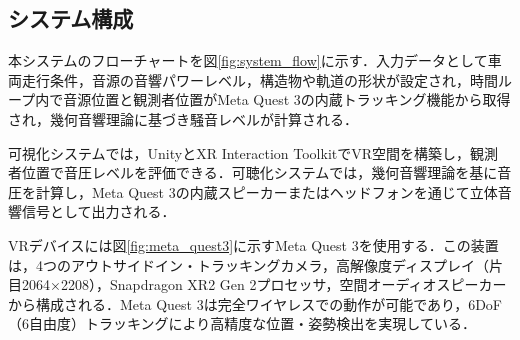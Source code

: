 \documentclass[10pt]{jsarticle}
\begin{document}
\subsection{システム構成}
本システムのフローチャートを図\ref{fig:system_flow}に示す．入力データとして車両走行条件，音源の音響パワーレベル，構造物や軌道の形状が設定され，時間ループ内で音源位置と観測者位置がMeta Quest 3の内蔵トラッキング機能から取得され，幾何音響理論に基づき騒音レベルが計算される．

可視化システムでは，UnityとXR Interaction ToolkitでVR空間を構築し，観測者位置で音圧レベルを評価できる．可聴化システムでは，幾何音響理論を基に音圧を計算し，Meta Quest 3の内蔵スピーカーまたはヘッドフォンを通じて立体音響信号として出力される．

VRデバイスには図\ref{fig:meta_quest3}に示すMeta Quest 3を使用する．この装置は，4つのアウトサイドイン・トラッキングカメラ，高解像度ディスプレイ（片目2064×2208），Snapdragon XR2 Gen 2プロセッサ，空間オーディオスピーカーから構成される．Meta Quest 3は完全ワイヤレスでの動作が可能であり，6DoF（6自由度）トラッキングにより高精度な位置・姿勢検出を実現している．
\end{document}
